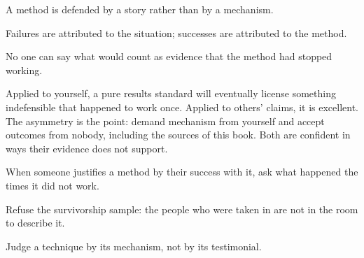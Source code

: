 \begin{feedback}
  \item A method is defended by a story rather than by a mechanism.
  \item Failures are attributed to the situation; successes are attributed to the method.
  \item No one can say what would count as evidence that the method had stopped working.
\end{feedback}

\begin{failure}
Applied to yourself, a pure results standard will eventually license something indefensible that happened to work once. Applied to others' claims, it is excellent. The asymmetry is the point: demand mechanism from yourself and accept outcomes from nobody, including the sources of this book. Both are confident in ways their evidence does not support.
\end{failure}

\begin{countermeasures}
  \item When someone justifies a method by their success with it, ask what happened the times it did not work.
  \item Refuse the survivorship sample: the people who were taken in are not in the room to describe it.
  \item Judge a technique by its mechanism, not by its testimonial.
\end{countermeasures}

\seesources
{}
